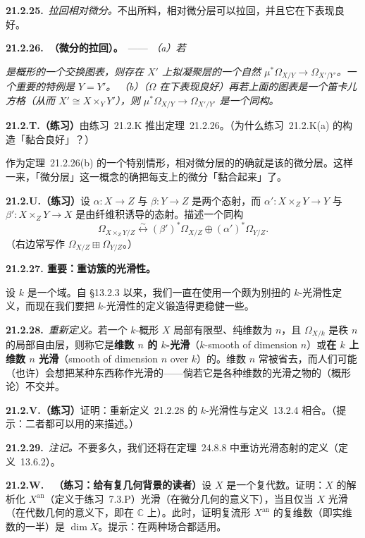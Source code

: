 \textbf{21.2.25.}\ \emph{拉回相对微分。}\quad 不出所料，相对微分层可以拉回，并且它在\trBaseChange{}下表现良好。

\textbf{21.2.26.\ \trhTheorem（微分的拉回）。}\ ——
\emph{（a）若}
\emph{是概形的一个交换图表，则存在 $X'$ 上拟凝聚层的一个自然\trHomomorphism{} $\mu^*\Omega_{X/Y}\to\Omega_{X'/Y'}$。一个重要的特例是 $Y=Y'$。}
\emph{（b）（$\Omega$ 在\trBaseChange{}下表现良好）再若上面的图表是一个笛卡儿方格（从而 $X'\cong X\times_YY'$），则 $\mu^*\Omega_{X/Y}\to\Omega_{X'/Y'}$ 是一个同构。}

\textbf{21.2.T.（练习）}\quad 由\mbox{练习~21.2.K} 推出\mbox{定理~21.2.26}。（为什么\mbox{练习~21.2.K(a)} 的构造「黏合良好」？）

作为\mbox{定理~21.2.26(b)} 的一个特别情形，相对微分层的\trFiber{}的确就是该\trFiber{}的微分层。这样一来，「微分层」这一概念的确把每支\trFiber{}上的微分「黏合起来」了。

\textbf{21.2.U.（练习）}\quad 设 $\alpha\colon X\to Z$ 与 $\beta\colon Y\to Z$ 是两个态射，而 $\alpha'\colon X\times_ZY\to Y$ 与 $\beta'\colon X\times_ZY\to X$ 是由纤维积诱导的态射。描述一个同构
\[
\Omega_{X\times_ZY/Z}\overset{\sim}{\longleftrightarrow}(\beta')^*\Omega_{X/Z}\oplus(\alpha')^*\Omega_{Y/Z}.
\]
（右边常写作 $\Omega_{X/Z}\boxplus\Omega_{Y/Z}$。）

\textbf{21.2.27. 重要：重访簇的光滑性。}

设 $k$ 是一个域。自 \S13.2.3 以来，我们一直在使用一个颇为别扭的 $k$-光滑性定义，而现在我们要把 $k$-光滑性的定义锻造得更稳健一些。

\textbf{21.2.28.}\ \emph{重新定义。}\quad 若一个 $k$-概形 $X$ 局部有限型、纯维数为 $n$，且 $\Omega_{X/k}$ 是秩 $n$ 的局部自由层，则称它是\textbf{维数 $n$ 的 $k$-光滑}（$k$-smooth of dimension $n$）或\textbf{在 $k$ 上维数 $n$ 光滑}（smooth of dimension $n$ over $k$）的。维数 $n$ 常被省去，而人们可能（也许）会想把某种东西称作光滑的——倘若它是各种维数的光滑之物的（概形论）不交并。

\textbf{21.2.V.（练习）}\quad 证明：\mbox{重新定义~21.2.28} 的 $k$-光滑性与\mbox{定义~13.2.4} 相合。（提示：二者都可以用\trJacobianMatrix{}的\trCokernel{}来描述。）

\textbf{21.2.29.}\ \emph{注记。}\quad 不要多久，我们还将在\mbox{定理~24.8.8} 中重访光滑态射的定义（\mbox{定义~13.6.2}）。

\textbf{21.2.W.}\ \extrahard\ \textbf{（练习：给有复几何背景的读者）}\quad 设 $X$ 是一个复代数\trVariety。证明：$X$ 的解析化 $X^{\mathrm{an}}$（定义于\mbox{练习~7.3.P}）光滑（在微分几何的意义下），当且仅当 $X$ 光滑（在代数几何的意义下，即在 $\mathbb{C}$ 上）。此时，证明复流形 $X^{\mathrm{an}}$ 的复维数（即实维数的一半）是 $\dim X$。提示：\trJacobianCriterion{}在两种场合都适用。

